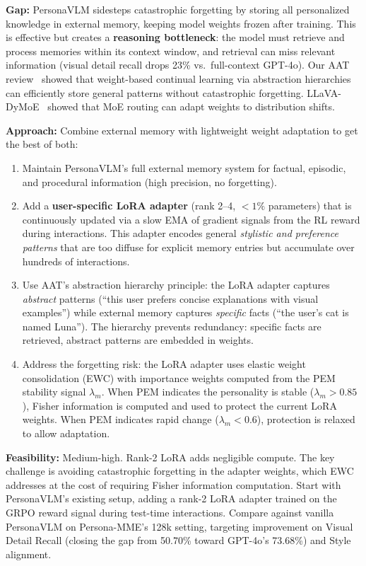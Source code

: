 \documentclass[11pt]{article}
\begin{document}
\textbf{Gap:} PersonaVLM sidesteps catastrophic forgetting by storing all personalized knowledge in external memory, keeping model weights frozen after training. This is effective but creates a \textbf{reasoning bottleneck}: the model must retrieve and process memories within its context window, and retrieval can miss relevant information (visual detail recall drops 23\% vs.\ full-context GPT-4o). Our AAT review~\cite{aat} showed that weight-based continual learning via abstraction hierarchies can efficiently store general patterns without catastrophic forgetting. LLaVA-DyMoE~\cite{dyMoE} showed that MoE routing can adapt weights to distribution shifts.

\textbf{Approach:} Combine external memory with lightweight weight adaptation to get the best of both:
\begin{enumerate}
    \item Maintain PersonaVLM's full external memory system for factual, episodic, and procedural information (high precision, no forgetting).

    \item Add a \textbf{user-specific LoRA adapter} (rank 2--4, $< 1\%$ parameters) that is continuously updated via a slow EMA of gradient signals from the RL reward during interactions. This adapter encodes general \textit{stylistic and preference patterns} that are too diffuse for explicit memory entries but accumulate over hundreds of interactions.

    \item Use AAT's abstraction hierarchy principle: the LoRA adapter captures \textit{abstract} patterns (``this user prefers concise explanations with visual examples'') while external memory captures \textit{specific} facts (``the user's cat is named Luna''). The hierarchy prevents redundancy: specific facts are retrieved, abstract patterns are embedded in weights.

    \item Address the forgetting risk: the LoRA adapter uses elastic weight consolidation (EWC) with importance weights computed from the PEM stability signal $\lambda_m$. When PEM indicates the personality is stable ($\lambda_m > 0.85$), Fisher information is computed and used to protect the current LoRA weights. When PEM indicates rapid change ($\lambda_m < 0.6$), protection is relaxed to allow adaptation.
\end{enumerate}

\textbf{Feasibility:} Medium-high. Rank-2 LoRA adds negligible compute. The key challenge is avoiding catastrophic forgetting in the adapter weights, which EWC addresses at the cost of requiring Fisher information computation. Start with PersonaVLM's existing setup, adding a rank-2 LoRA adapter trained on the GRPO reward signal during test-time interactions. Compare against vanilla PersonaVLM on Persona-MME's 128k setting, targeting improvement on Visual Detail Recall (closing the gap from 50.70\% toward GPT-4o's 73.68\%) and Style alignment.
\end{document}
